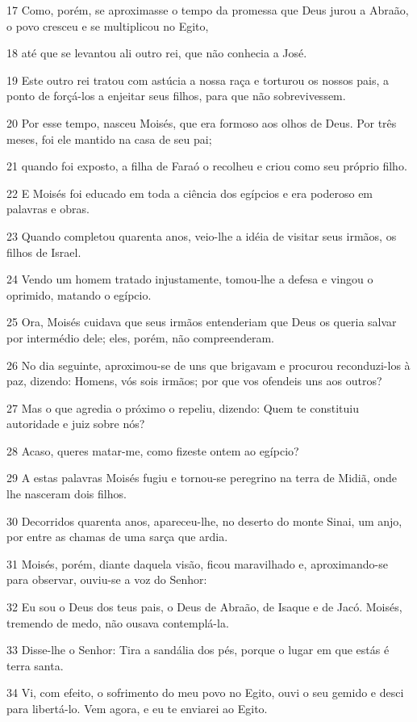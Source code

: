 \par 17 Como, porém, se aproximasse o tempo da promessa que Deus jurou a Abraão, o povo cresceu e se multiplicou no Egito,
\par 18 até que se levantou ali outro rei, que não conhecia a José.
\par 19 Este outro rei tratou com astúcia a nossa raça e torturou os nossos pais, a ponto de forçá-los a enjeitar seus filhos, para que não sobrevivessem.
\par 20 Por esse tempo, nasceu Moisés, que era formoso aos olhos de Deus. Por três meses, foi ele mantido na casa de seu pai;
\par 21 quando foi exposto, a filha de Faraó o recolheu e criou como seu próprio filho.
\par 22 E Moisés foi educado em toda a ciência dos egípcios e era poderoso em palavras e obras.
\par 23 Quando completou quarenta anos, veio-lhe a idéia de visitar seus irmãos, os filhos de Israel.
\par 24 Vendo um homem tratado injustamente, tomou-lhe a defesa e vingou o oprimido, matando o egípcio.
\par 25 Ora, Moisés cuidava que seus irmãos entenderiam que Deus os queria salvar por intermédio dele; eles, porém, não compreenderam.
\par 26 No dia seguinte, aproximou-se de uns que brigavam e procurou reconduzi-los à paz, dizendo: Homens, vós sois irmãos; por que vos ofendeis uns aos outros?
\par 27 Mas o que agredia o próximo o repeliu, dizendo: Quem te constituiu autoridade e juiz sobre nós?
\par 28 Acaso, queres matar-me, como fizeste ontem ao egípcio?
\par 29 A estas palavras Moisés fugiu e tornou-se peregrino na terra de Midiã, onde lhe nasceram dois filhos.
\par 30 Decorridos quarenta anos, apareceu-lhe, no deserto do monte Sinai, um anjo, por entre as chamas de uma sarça que ardia.
\par 31 Moisés, porém, diante daquela visão, ficou maravilhado e, aproximando-se para observar, ouviu-se a voz do Senhor:
\par 32 Eu sou o Deus dos teus pais, o Deus de Abraão, de Isaque e de Jacó. Moisés, tremendo de medo, não ousava contemplá-la.
\par 33 Disse-lhe o Senhor: Tira a sandália dos pés, porque o lugar em que estás é terra santa.
\par 34 Vi, com efeito, o sofrimento do meu povo no Egito, ouvi o seu gemido e desci para libertá-lo. Vem agora, e eu te enviarei ao Egito.
